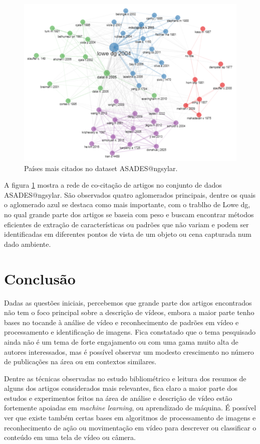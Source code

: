 \begin{figure}[H]
    \centering
    \includegraphics[angle=0,width=1\textwidth]{experiments/ngsylar/PesqBibliogr/Imagens/ASADES-Intelect.png}
    \caption{Países mais citados no dataset ASADES@ngsylar.}
    \label{fig:ASADES@ngsylar:StIntel}
\end{figure}

A figura \ref{fig:ASADES@ngsylar:StIntel} mostra a rede de co-citação de artigos no conjunto de dados ASADES@ngsylar. São observados quatro aglomerados principais, dentre os quais o aglomerado azul se destaca como mais importante, com o trablho de Lowe dg, no qual grande parte dos artigos se baseia com peso e buscam encontrar métodos eficientes de extração de características ou padrões que não variam e podem ser identificadas em diferentes pontos de vista de um objeto ou cena capturada num dado ambiente.

\section{Conclusão}
Dadas as questões iniciais, percebemos que grande parte dos artigos encontrados não tem o foco principal sobre a descrição de vídeos, embora a maior parte tenho bases no tocande à análise de vídeo e reconhecimento de padrões em vídeo e processamento e identificação de imagens. Fica constatado que o tema pesquisado ainda não é um tema de forte engajamento ou com uma gama muito alta de autores interessados, mas é possível observar um modesto crescimento no número de publicações na área ou em contextos similares.

Dentre as técnicas observadas no estudo bibliométrico e leitura dos resumos de alguns dos artigos considerados mais relevantes, fica claro a maior parte dos estudos e experimentos feitos na área de análise e descrição de vídeo estão fortemente apoiadas em \textit{machine learning}, ou aprendizado de máquina. É possível ver que existe também certas bases em algoritmos de processamento de imagens e reconhecimento de ação ou movimentação em vídeo para descrever ou classificar o conteúdo em uma tela de vídeo ou câmera.

